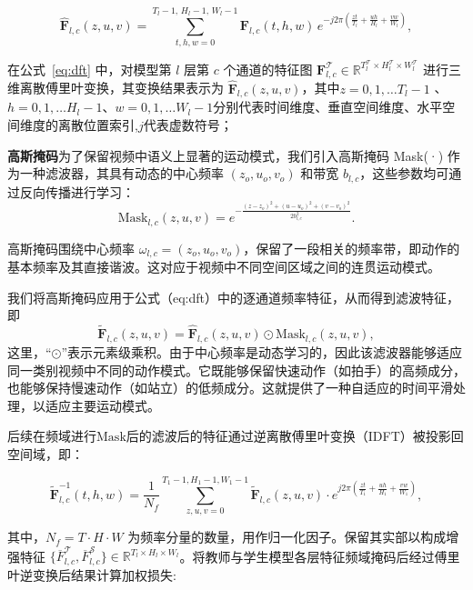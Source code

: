 \documentclass[10.5pt,letterpaper]{article}
\begin{document}
\begin{equation}
\hat{\textbf{F}}_{l,c}(z,u,v)
=
\sum_{t,h,w=0}^{T_l-1,\,H_l-1,\,W_l-1}
\textbf{F}_{l,c}(t,h,w)\,
e^{-j 2\pi \left( \frac{z t}{T_l} + \frac{u h}{H_l} + \frac{v w}{W_l} \right)} ,
\label{eq:dft}
\end{equation}

在公式~\eqref{eq:dft} 中，对模型第 $l$ 层第 $c$ 个通道的特征图 $\textbf{F}_{l,c}^\mathcal{T} \in \mathbb{R}^{T_l^\mathcal{T} \times H_l^\mathcal{T} \times W_l^\mathcal{T}}$ 进行三维离散傅里叶变换，其变换结果表示为 $\hat{\textbf{F}}_{l,c}(z,u,v)$，其中$z = 0,1,\ldots T_l-1$ 、$h =  0,1,\ldots H_l-1$、$w =  0,1,\ldots W_l-1$分别代表时间维度、垂直空间维度、水平空间维度的离散位置索引,$j$代表虚数符号；

\textbf{高斯掩码}为了保留视频中语义上显著的运动模式，我们引入高斯掩码 Mask(·) 作为一种滤波器，其具有动态的中心频率 \((z_o, u_o, v_o)\) 和带宽 \(b_{l,c}\)，这些参数均可通过反向传播进行学习：
\begin{equation}
\text{Mask}_{l,c}(z, u, v) = e^{-\frac{(z - z_o)^2 + (u - u_o)^2 + (v - v_o)^2}{2b_{l,c}^2}}.
\label{eq:teacher-mask}
\end{equation}

高斯掩码围绕中心频率 \(\omega_{l,c} = (z_o, u_o, v_o)\)，保留了一段相关的频率带，即动作的基本频率及其直接谐波。这对应于视频中不同空间区域之间的连贯运动模式。

我们将高斯掩码应用于公式（eq:dft）中的逐通道频率特征，从而得到滤波特征，即
\begin{equation}
 \tilde{\textbf{F}}_{l,c}(z, u, v) = \hat{\textbf{F}}_{l,c}(z, u, v) \odot \text{Mask}_{l,c}(z, u, v), 
\label{eq:mask}
\end{equation}
这里，“\(\odot\)”表示元素级乘积。由于中心频率是动态学习的，因此该滤波器能够适应同一类别视频中不同的动作模式。它既能够保留快速动作（如拍手）的高频成分，也能够保持慢速动作（如站立）的低频成分。这就提供了一种自适应的时间平滑处理，以适应主要运动模式。

后续在频域进行$\mathrm{Mask}$后的滤波后的特征通过逆离散傅里叶变换（IDFT）被投影回空间域，即：

\begin{equation}
\tilde{\textbf{F}}_{l,c}^{-1}(t, h, w) = \frac{1}{N_f} \sum_{z,u,v=0}^{T_1-1,H_1-1,W_1-1} \tilde{\textbf{F}}_{l,c}(z, u, v) \cdot e^{j2\pi\left(\frac{zt}{T_1} + \frac{uh}{H_1} + \frac{vw}{W_1}\right)},
\label{eq:idft}
\end{equation}

其中，\(N_f = T \cdot H \cdot W\) 为频率分量的数量，用作归一化因子。保留其实部以构成增强特征 \(\{\overline{F}^{\mathcal{T}}_{l,c}, \overline{F}^{\mathcal{S}}_{l,c}\} \in \mathbb{R}^{T_l \times H_l \times W_l}\)。将教师与学生模型各层特征频域掩码后经过傅里叶逆变换后结果计算加权损失:
\end{document}
